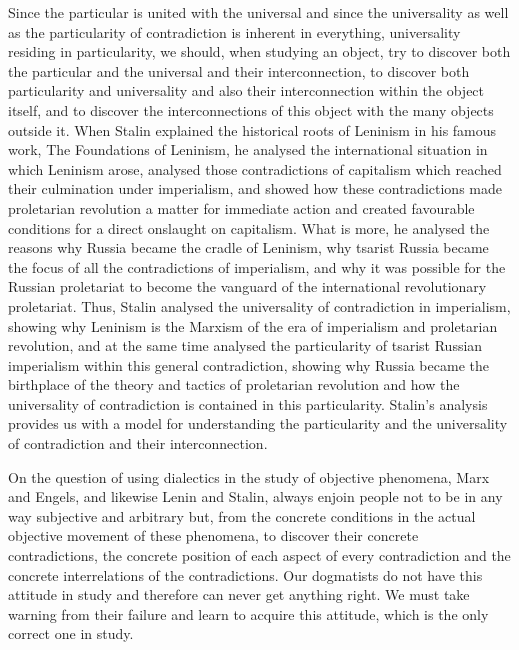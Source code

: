 \documentclass{article}
\begin{document}
Since the particular is united with the universal and since the universality as
well as the particularity of contradiction is inherent in everything,
universality residing in particularity, we should, when studying an object, try
to discover both the particular and the universal and their interconnection, to
discover both particularity and universality and also their interconnection
within the object itself, and to discover the interconnections of this object
with the many objects outside it. When Stalin explained the historical roots of
Leninism in his famous work, The Foundations of Leninism, he analysed the
international situation in which Leninism arose, analysed those contradictions
of capitalism which reached their culmination under imperialism, and showed how
these contradictions made proletarian revolution a matter for immediate action
and created favourable conditions for a direct onslaught on capitalism. What is
more, he analysed the reasons why Russia became the cradle of Leninism, why
tsarist Russia became the focus of all the contradictions of imperialism, and
why it was possible for the Russian proletariat to become the vanguard of the
international revolutionary proletariat. Thus, Stalin analysed the universality
of contradiction in imperialism, showing why Leninism is the Marxism of the era
of imperialism and proletarian revolution, and at the same time analysed the
particularity of tsarist Russian imperialism within this general contradiction,
showing why Russia became the birthplace of the theory and tactics of
proletarian revolution and how the universality of contradiction is contained
in this particularity. Stalin's analysis provides us with a model for
understanding the particularity and the universality of contradiction and their
interconnection.

On the question of using dialectics in the study of objective phenomena, Marx
and Engels, and likewise Lenin and Stalin, always enjoin people not to be in
any way subjective and arbitrary but, from the concrete conditions in the
actual objective movement of these phenomena, to discover their concrete
contradictions, the concrete position of each aspect of every contradiction and
the concrete interrelations of the contradictions. Our dogmatists do not have
this attitude in study and therefore can never get anything right. We must take
warning from their failure and learn to acquire this attitude, which is the
only correct one in study.
\end{document}
